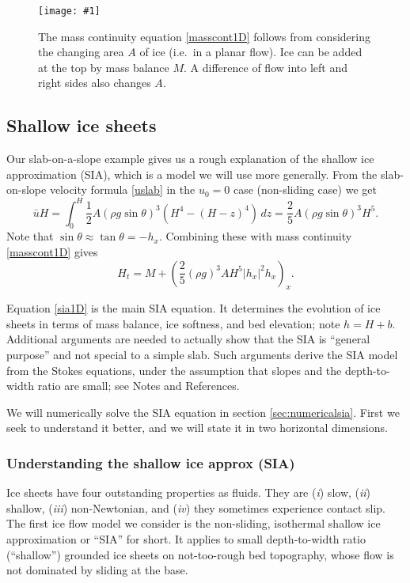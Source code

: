 \documentclass[titlepage,letterpaper,final,12pt]{scrartcl}
\newcommand{\onefigsize}[3]{
\begin{figure}[ht]
\centering
\texttt{[image: \#1]}
\caption{#2}
\label{fig:#1}
\end{figure}}
\begin{document}
\onefigsize{slabmasscontfig}{The mass continuity equation \eqref{masscont1D} follows from considering the changing area $A$ of ice (i.e.~in a planar flow).  Ice can be added at the top by mass balance $M$.  A difference of flow into left and right sides also changes $A$.}{2.5in}


\subsection{Shallow ice sheets}  Our slab-on-a-slope example gives us a rough explanation of the shallow ice approximation (SIA), which is a model we will use more generally.  From the slab-on-slope velocity formula \eqref{uslab} in the $u_0=0$ case (non-sliding case) we get
\begin{equation}
\bar u H = \int_0^H \frac{1}{2} A (\rho g \sin\theta)^3  \left(H^4 - (H-z)^4\right)\,dz = \frac{2}{5} A (\rho g \sin\theta)^3 H^5. \label{siaubar}
\end{equation}
Note that $\sin \theta \approx \tan\theta = - h_x$.  Combining these with mass continuity \eqref{masscont1D} gives
\begin{equation}
  H_t = M + \left(\frac{2}{5} (\rho g)^3 A H^5 |h_x|^2 h_x\right)_x. \label{sia1D}
\end{equation}

Equation \eqref{sia1D} is the main SIA equation.  It determines the evolution of ice sheets in terms of mass balance, ice softness, and bed elevation; note $h=H+b$.  Additional arguments are needed to actually show that the SIA is ``general purpose'' and not special to a simple slab.  Such arguments derive the SIA model from the Stokes equations, under the assumption that slopes and the depth-to-width ratio are small; see Notes and References.

We will numerically solve the SIA equation in section \ref{sec:numericalsia}.  First we seek to understand it better, and we will state it in two horizontal dimensions.

\subsubsection*{Understanding the shallow ice approx (SIA)}  Ice sheets have four outstanding properties as fluids.  They are (\emph{i}) slow, (\emph{ii}) shallow,  (\emph{iii}) non-Newtonian, and (\emph{iv}) they sometimes experience contact slip.  The first ice flow model we consider is the non-sliding, isothermal shallow ice approximation or ``SIA'' for short.  It applies to small depth-to-width ratio (``shallow'') grounded ice sheets on not-too-rough bed topography, whose flow is not dominated by sliding at the base.
\end{document}
